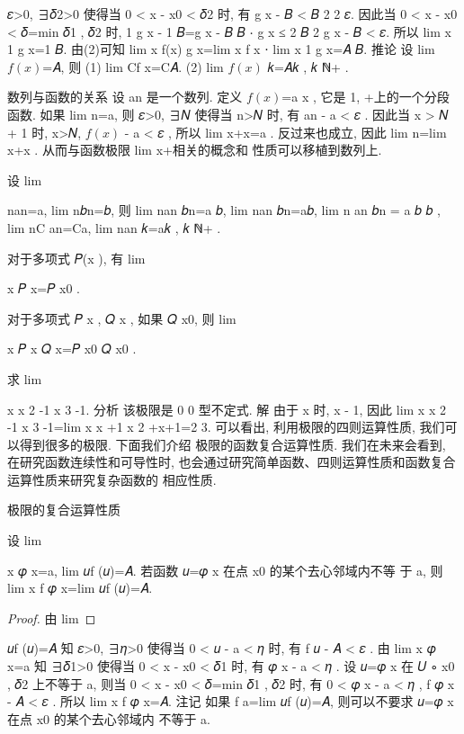 \begin{frame}
	\forall 𝜀>0, ∃𝛿2>0 使得当 0 < x - x0 < 𝛿2 时, 有 g x - 𝐵 < 𝐵 2
2 𝜀.
	因此当 0 < x - x0 < 𝛿=min 𝛿1 , 𝛿2 时,
1
g x - 1
𝐵=g x - 𝐵
𝐵 ⋅ g x ≤ 2
𝐵 2 g x - 𝐵 < 𝜀.
	所以 lim
x
1
g x=1
𝐵. 由(2)可知 lim
x
f(x)
g x=lim
x
f x ⋅ lim
x
1
g x=𝐴
𝐵.
	推论 设 lim $f(x)$=𝐴, 则
	(1) lim Cf x=C𝐴.
	(2) lim $f(x)$ 𝑘=𝐴𝑘 , 𝑘 \in ℕ+ .
\end{frame}


\begin{frame}
	数列与函数的关系
	设 an 是一个数列. 定义 $f(x)$=a x , 它是 1, +\infty 上的一个分段函数.
	如果 lim
n\ra\inftyan=a, 则 \forall 𝜀>0, ∃𝑁 使得当 n>𝑁 时, 有 an - a < 𝜀 . 因此当 x >
𝑁 + 1 时, x>𝑁, $f(x)$ - a < 𝜀 , 所以 lim
x\ra+\inftyf x=a
.
	反过来也成立, 因此 lim
n\ra\inftyan=lim
x\ra+\inftyf x . 从而与函数极限 lim
x\ra+\infty 相关的概念和
性质可以移植到数列上.
	\begin{theorem}
设 lim
\end{theorem}
n\ra\infty an=a, lim
n\ra\infty 𝑏n=𝑏, 则
	lim
n\ra\infty an \pm 𝑏n=a \pm 𝑏, lim
n\ra\infty an 𝑏n=a𝑏, lim
n\ra\infty
an
𝑏n
= a
𝑏 𝑏 ,
	lim
n\ra\infty C an=Ca, lim
n\ra\infty an
𝑘=a𝑘 , 𝑘 \in ℕ+ .
\end{frame}


\begin{frame}
	\begin{example}
对于多项式 𝑃(x ), 有 lim
\end{example}
x
𝑃 x=𝑃 x0 .
	\begin{example}
对于多项式 𝑃 x , 𝑄 x , 如果 𝑄 x0, 则 lim
\end{example}
x
𝑃 x
𝑄 x=𝑃 x0
𝑄 x0
.
	\begin{example}
求 lim
\end{example}
x
x 2 -1
x 3 -1.
	分析 该极限是 0
0 型不定式.
	解 由于 x  时, x - 1, 因此 lim
x
x 2 -1
x 3 -1=lim
x
x +1
x 2 +x+1=2
3.
	可以看出, 利用极限的四则运算性质, 我们可以得到很多的极限. 下面我们介绍
极限的函数复合运算性质. 我们在未来会看到, 在研究函数连续性和可导性时,
也会通过研究简单函数、四则运算性质和函数复合运算性质来研究复杂函数的
相应性质.
\end{frame}


\begin{frame}
极限的复合运算性质
	\begin{theorem}
设 lim
\end{theorem}
x 
𝜑 x=a, lim
𝑢\raa f (𝑢)=𝐴. 若函数 𝑢=𝜑 x 在点 x0 的某个去心邻域内不等
于 a, 则
lim
x 
f 𝜑 x=lim
𝑢\raa f (𝑢)=𝐴.
	\begin{proof}
由 lim
\end{proof}
𝑢\raa f (𝑢)=𝐴 知 \forall 𝜀>0, ∃𝜂>0 使得当 0 < 𝑢 - a < 𝜂 时, 有 f 𝑢 - 𝐴 < 𝜀 .
	由 lim
x
𝜑 x=a 知 ∃𝛿1>0 使得当 0 < x - x0 < 𝛿1 时, 有 𝜑 x - a < 𝜂 .
	设 𝑢=𝜑 x 在 𝑈
∘
x0 , 𝛿2 上不等于 a, 则当 0 < x - x0 < 𝛿=min 𝛿1 , 𝛿2 时, 有
0 < 𝜑 x - a < 𝜂 , f 𝜑 x - 𝐴 < 𝜀 .
	所以 lim
x
f 𝜑 x=𝐴.
	注记 如果 f a=lim
𝑢\raa f (𝑢)=𝐴, 则可以不要求 𝑢=𝜑 x 在点 x0 的某个去心邻域内
不等于 a.
\end{frame}


